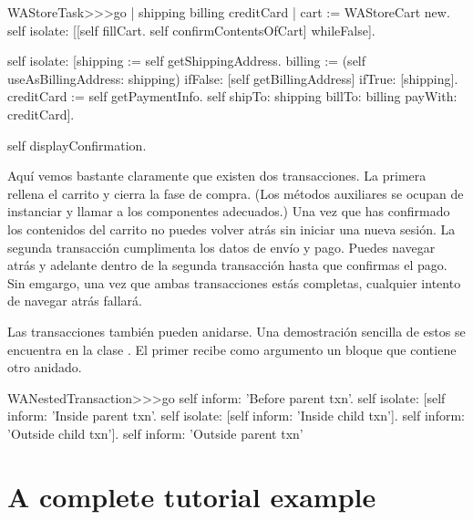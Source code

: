 \documentclass[a4paper,10pt,twoside]{book}
\begin{document}
\begin{code}{}
WAStoreTask>>>go
	| shipping billing creditCard |
	cart := WAStoreCart new.
	self isolate:
		[[self fillCart.
		self confirmContentsOfCart]
			whileFalse].

	self isolate:
		[shipping := self getShippingAddress.
		billing := (self useAsBillingAddress: shipping)
					ifFalse: [self getBillingAddress]
					ifTrue: [shipping].
		creditCard := self getPaymentInfo.
		self shipTo: shipping billTo: billing payWith: creditCard].

	self displayConfirmation.
\end{code}

Aquí vemos bastante claramente que existen dos transacciones.
La primera rellena el carrito y cierra la fase de compra.
(Los métodos auxiliares  \etc se ocupan de instanciar y llamar a los componentes adecuados.)
Una vez que has confirmado los contenidos del carrito no puedes volver atrás sin iniciar una nueva sesión.
La segunda transacción cumplimenta los datos de envío y pago.
Puedes navegar atrás y adelante dentro de la segunda transacción hasta que confirmas el pago.
Sin emgargo, una vez que ambas transacciones estás completas, cualquier intento de navegar atrás fallará.

Las transacciones también pueden anidarse.
Una demostración sencilla de estos se encuentra en la clase .
El primer  recibe como argumento un bloque que contiene otro  anidado.

\begin{code}{}
WANestedTransaction>>>go
	self inform: 'Before parent txn'.
	self isolate:
			[self inform: 'Inside parent txn'.
			self isolate: [self inform: 'Inside child txn'].
			self inform: 'Outside child txn'].
	self inform: 'Outside parent txn'
\end{code}


\section{A complete tutorial example}
\end{document}
